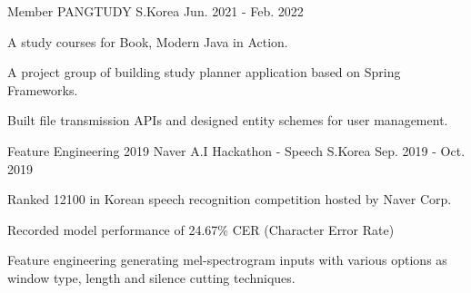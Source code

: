 \begin{cventries}
    \cventry
    {Member} %
    {PANGTUDY} %
    {S.Korea} %
    {Jun. 2021 - Feb. 2022} %
    {
      \begin{cvitems} %
        \item {A study courses for Book, Modern Java in Action.}
        \item {A project group of building study planner application based on Spring Frameworks.}
        \item {Built file transmission APIs and designed entity schemes for user management.}
      \end{cvitems}
    }

  \cventry
    {Feature Engineering} %
    {2019 Naver A.I Hackathon - Speech} %
    {S.Korea} %
    {Sep. 2019 - Oct. 2019} %
    {
      \begin{cvitems} %
        \item {Ranked 12\/100 in Korean speech recognition competition hosted by Naver Corp.}
        \item {Recorded model performance of 24.67\% CER (Character Error Rate)}
        \item {Feature engineering generating mel-spectrogram inputs with various options as window type, length and silence cutting techniques.}
      \end{cvitems}
    }

\end{cventries}
